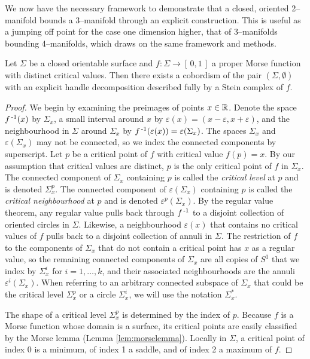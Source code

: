 \label{sec:2bound3}

We now have the necessary framework to demonstrate that a closed, oriented 2--manifold bounds a 3--manifold through an explicit construction.
This is useful as a jumping off point for the case one dimension higher, that of 3--manifolds bounding 4--manifolds, which draws on the same framework and methods.

\begin{theorem}
	\label{thm:2bound3}
	Let $\Sigma$ be a closed orientable surface and $f:\Sigma\to[\,0,1\,]$ a proper Morse function with distinct critical values.
	Then there exists a cobordism of the pair $(\Sigma,\emptyset)$ with an explicit handle decomposition described fully by a Stein complex of $f$.
\end{theorem}

\begin{proof}
	We begin by examining the preimages of points $x\in\mathbb{R}$.
	Denote the space $f^{\,\text{-}1}(x)$ by $\Sigma_x$, a small interval around $x$ by $\varepsilon(x)=(x-\varepsilon,x+\varepsilon)$, and the neighbourhood in $\Sigma$ around $\Sigma_x$ by $f^{\,\text{-}1}(\varepsilon(x))=\varepsilon(\Sigma_x)$.
	The spaces $\Sigma_x$ and $\varepsilon(\Sigma_x)$ may not be connected, so we index the connected components by superscript.
	Let $p$ be a critical point of $f$ with critical value $f(p)=x$.
	By our assumption that critical values are distinct, $p$ is the only critical point of $f$ in $\Sigma_x$.
	The connected component of $\Sigma_x$ containing $p$ is called the \emph{critical level} at $p$ and is denoted $\Sigma_x^p$.
	The connected component of $\varepsilon(\Sigma_x)$ containing $p$ is called the \emph{critical neighbourhood} at $p$ and is denoted $\varepsilon^p(\Sigma_x)$.
	By the regular value theorem, any regular value pulls back through $f^{\,\text{-}1}$ to a disjoint collection of oriented circles in $\Sigma$.
	Likewise, a neighbourhood $\varepsilon(x)$ that contains no critical values of $f$ pulls back to a disjoint collection of annuli in $\Sigma$.
	The restriction of $f$ to the components of $\Sigma_x$ that do not contain a critical point has $x$ as a regular value, so the remaining connected components of $\Sigma_x$ are all copies of $S^1$ that we index by $\Sigma_x^i$ for $i=1,\dots,k$, and their associated neighbourhoods are the annuli $\varepsilon^i(\Sigma_x)$.
	When referring to an arbitrary connected subspace of $\Sigma_x$ that could be the critical level $\Sigma_x^p$ or a circle $\Sigma_x^i$, we will use the notation $\Sigma_x^*$.
	
	The shape of a critical level $\Sigma_x^p$ is determined by the index of $p$.
	Because $f$ is a Morse function whose domain is a surface, its critical points are easily classified by the Morse lemma (Lemma \ref{lem:morselemma}).
	Locally in $\Sigma$, a critical point of index 0 is a minimum, of index 1 a saddle, and of index 2 a maximum of $f$.
	

\end{proof}
